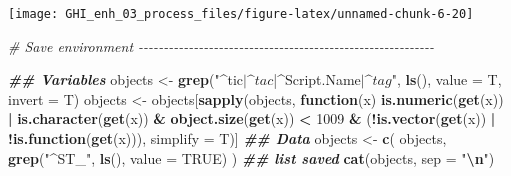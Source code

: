 \documentclass[
  10pt,
  a4paper,oneside]{article}
\newenvironment{Shaded}{\begin{snugshade}}{\end{snugshade}}
\newcommand{\AttributeTok}[1]{\textcolor[rgb]{0.13,0.29,0.53}{#1}}
\newcommand{\CommentTok}[1]{\textcolor[rgb]{0.56,0.35,0.01}{\textit{#1}}}
\newcommand{\ConstantTok}[1]{\textcolor[rgb]{0.56,0.35,0.01}{#1}}
\newcommand{\ControlFlowTok}[1]{\textcolor[rgb]{0.13,0.29,0.53}{\textbf{#1}}}
\newcommand{\DecValTok}[1]{\textcolor[rgb]{0.00,0.00,0.81}{#1}}
\newcommand{\DocumentationTok}[1]{\textcolor[rgb]{0.56,0.35,0.01}{\textbf{\textit{#1}}}}
\newcommand{\FunctionTok}[1]{\textcolor[rgb]{0.13,0.29,0.53}{\textbf{#1}}}
\newcommand{\NormalTok}[1]{#1}
\newcommand{\OtherTok}[1]{\textcolor[rgb]{0.56,0.35,0.01}{#1}}
\newcommand{\SpecialCharTok}[1]{\textcolor[rgb]{0.81,0.36,0.00}{\textbf{#1}}}
\newcommand{\StringTok}[1]{\textcolor[rgb]{0.31,0.60,0.02}{#1}}
\begin{document}
\begin{center}\texttt{[image: GHI\_enh\_03\_process\_files/figure-latex/unnamed-chunk-6-20]} \end{center}

\begin{Shaded}
\begin{Highlighting}[]
\CommentTok{\#  Save environment  {-}{-}{-}{-}{-}{-}{-}{-}{-}{-}{-}{-}{-}{-}{-}{-}{-}{-}{-}{-}{-}{-}{-}{-}{-}{-}{-}{-}{-}{-}{-}{-}{-}{-}{-}{-}{-}{-}{-}{-}{-}{-}{-}{-}{-}{-}{-}{-}{-}{-}{-}{-}{-}{-}{-}{-}{-}{-}{-}}

\DocumentationTok{\#\# Variables}
\NormalTok{objects }\OtherTok{\textless{}{-}} \FunctionTok{grep}\NormalTok{(}\StringTok{"\^{}tic$|\^{}tac$|\^{}Script.Name$|\^{}tag$"}\NormalTok{, }\FunctionTok{ls}\NormalTok{(), }\AttributeTok{value =}\NormalTok{ T, }\AttributeTok{invert =}\NormalTok{ T)}
\NormalTok{objects }\OtherTok{\textless{}{-}}\NormalTok{ objects[}\FunctionTok{sapply}\NormalTok{(objects, }\ControlFlowTok{function}\NormalTok{(x)}
    \FunctionTok{is.numeric}\NormalTok{(}\FunctionTok{get}\NormalTok{(x)) }\SpecialCharTok{|}
        \FunctionTok{is.character}\NormalTok{(}\FunctionTok{get}\NormalTok{(x)) }\SpecialCharTok{\&}
        \FunctionTok{object.size}\NormalTok{(}\FunctionTok{get}\NormalTok{(x)) }\SpecialCharTok{\textless{}} \DecValTok{1009} \SpecialCharTok{\&}
\NormalTok{        (}\SpecialCharTok{!}\FunctionTok{is.vector}\NormalTok{(}\FunctionTok{get}\NormalTok{(x)) }\SpecialCharTok{|}
             \SpecialCharTok{!}\FunctionTok{is.function}\NormalTok{(}\FunctionTok{get}\NormalTok{(x))), }\AttributeTok{simplify =}\NormalTok{ T)]}
\DocumentationTok{\#\# Data}
\NormalTok{objects }\OtherTok{\textless{}{-}} \FunctionTok{c}\NormalTok{(}
\NormalTok{    objects,}
    \FunctionTok{grep}\NormalTok{(}\StringTok{"\^{}ST\_"}\NormalTok{, }\FunctionTok{ls}\NormalTok{(), }\AttributeTok{value =} \ConstantTok{TRUE}\NormalTok{)}
\NormalTok{)}
\DocumentationTok{\#\# list saved}
\FunctionTok{cat}\NormalTok{(objects, }\AttributeTok{sep =} \StringTok{"}\SpecialCharTok{\textbackslash{}n}\StringTok{"}\NormalTok{)}
\end{Highlighting}
\end{Shaded}
\end{document}

